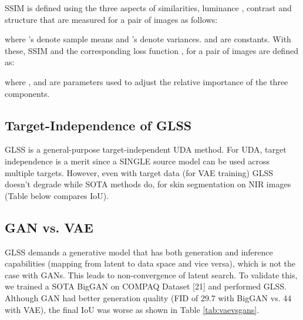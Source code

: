 \documentclass[runningheads]{llncs}
\begin{document}
SSIM  is defined using the three aspects of similarities, luminance , contrast  and structure  that are measured for a pair of images  as follows:


where 's denote sample means and 's denote variances.  and  are constants. With these, SSIM and the corresponding loss function , for a pair of images  are defined as: 

where ,  and  are parameters used to adjust the relative importance of the three components.


\begin{table}[h]
\caption{IoU comparison for Target-Independence of GLSS with change in the amount of target data. GLSS performance is not affected by change in the amount of target data during training while other SOTA methods degrade.}
\begin{center}
\end{center}
\label{tab:vaevsgans}
\end{table} 

\subsection{Target-Independence of GLSS}
GLSS is a general-purpose target-independent UDA method. For UDA, target independence is a merit since a SINGLE source model can be used across multiple targets. However, even with target data (for VAE training) GLSS doesn’t degrade while SOTA methods do, for skin segmentation on NIR images (Table below compares IoU). 

\subsection{GAN vs. VAE}
GLSS demands a generative model that has both generation and inference capabilities (mapping from latent to data space and vice versa), which is not the case with GANs. This leads to non-convergence of latent search. To validate this, we trained a SOTA BigGAN \cite{brock2018large} on COMPAQ Dataset [21] and performed GLSS. Although GAN had better generation quality (FID of 29.7 with BigGAN vs. 44 with VAE), the final IoU was worse as shown in Table \ref{tab:vaevsgans}.
\end{document}
